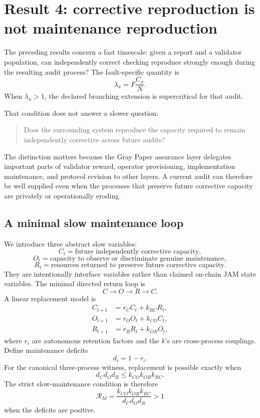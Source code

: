 \section{Result 4: corrective reproduction is not maintenance reproduction}
\label{sec:recurrent-maintenance}

The preceding results concern a fast timescale: given a report and a validator population, can independently correct checking reproduce strongly enough during the resulting audit process?  The fault-specific quantity is
\[
\lambda_x=F\frac{C_x}{N}.
\]
When \(\lambda_x>1\), the declared branching extension is supercritical for that audit.

That condition does not answer a slower question:
\begin{quote}
Does the surrounding system reproduce the capacity required to remain independently corrective across future audits?
\end{quote}

The distinction matters because the Gray Paper assurance layer delegates important parts of validator reward, operator provisioning, implementation maintenance, and protocol revision to other layers.  A current audit can therefore be well supplied even when the processes that preserve future corrective capacity are privately or operationally eroding.

\subsection{A minimal slow maintenance loop}

We introduce three abstract slow variables:
\[
C_t=\text{future independently corrective capacity},
\]
\[
O_t=\text{capacity to observe or discriminate genuine maintenance},
\]
\[
R_t=\text{resources returned to preserve future corrective capacity}.
\]
They are intentionally interface variables rather than claimed on-chain JAM state variables.  The minimal directed return loop is
\[
C\longrightarrow O\longrightarrow R\longrightarrow C.
\]
A linear replacement model is
\[
\begin{aligned}
C_{t+1}&=r_C C_t+k_{RC}R_t,\\
O_{t+1}&=r_O O_t+k_{CO}C_t,\\
R_{t+1}&=r_R R_t+k_{OR}O_t,
\end{aligned}
\]
where \(r_i\) are autonomous retention factors and the \(k\)'s are cross-process couplings.  Define maintenance deficits
\[
d_i=1-r_i.
\]
For the canonical three-process witness, replacement is possible exactly when
\[
\boxed{
d_Cd_Od_R\le k_{CO}k_{OR}k_{RC}.}
\]
The strict slow-maintenance condition is therefore
\[
\boxed{
\mathcal R_M
=\frac{k_{CO}k_{OR}k_{RC}}{d_Cd_Od_R}>1
}
\]
when the deficits are positive.


